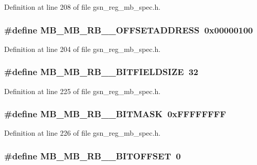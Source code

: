 Definition at line 208 of file gsn\_\-reg\_\-mb\_\-spec.h.

\hypertarget{a00562_a610b968a7a2c9b04ba6211adbf2c38d5}{
\subsubsection[{MB\_\-MB\_\-RB\_\-0\_\-OFFSETADDRESS}]{\setlength{\rightskip}{0pt plus 5cm}\#define MB\_\-MB\_\-RB\_\_\-OFFSETADDRESS~0x00000100}}
\label{a00562_a610b968a7a2c9b04ba6211adbf2c38d5}


Definition at line 204 of file gsn\_\-reg\_\-mb\_\-spec.h.

\hypertarget{a00562_a72ee8238201c63ab9740fab84eb4d9d8}{
\subsubsection[{MB\_\-MB\_\-RB\_\-1\_\-BITFIELDSIZE}]{\setlength{\rightskip}{0pt plus 5cm}\#define MB\_\-MB\_\-RB\_\_\-BITFIELDSIZE~32}}
\label{a00562_a72ee8238201c63ab9740fab84eb4d9d8}


Definition at line 225 of file gsn\_\-reg\_\-mb\_\-spec.h.

\hypertarget{a00562_a8f1c60fd420e33387a849cd55c73dcfa}{
\subsubsection[{MB\_\-MB\_\-RB\_\-1\_\-BITMASK}]{\setlength{\rightskip}{0pt plus 5cm}\#define MB\_\-MB\_\-RB\_\_\-BITMASK~0xFFFFFFFF}}
\label{a00562_a8f1c60fd420e33387a849cd55c73dcfa}


Definition at line 226 of file gsn\_\-reg\_\-mb\_\-spec.h.

\hypertarget{a00562_a4e0a722653052b35a9c3cdd0a0bf3277}{
\subsubsection[{MB\_\-MB\_\-RB\_\-1\_\-BITOFFSET}]{\setlength{\rightskip}{0pt plus 5cm}\#define MB\_\-MB\_\-RB\_\_\-BITOFFSET~0}}
\label{a00562_a4e0a722653052b35a9c3cdd0a0bf3277}


